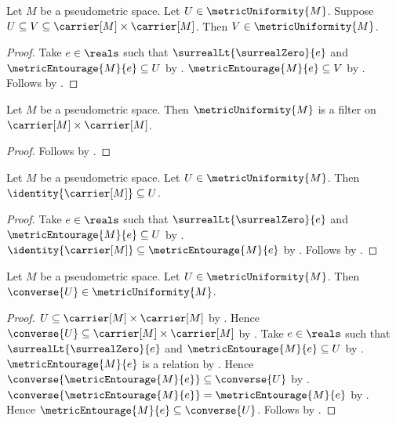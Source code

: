 \begin{proposition}\label{metric_uniformity_upward}
    Let $M$ be a pseudometric space.
    Let $U\in\metricUniformity{M}$.
    Suppose
        $U\subseteq V\subseteq\carrier[M]\times\carrier[M]$.
    Then $V\in\metricUniformity{M}$.
\end{proposition}
\begin{proof}
    Take $e\in\reals$ such that
        $\surrealLt{\surrealZero}{e}$ and
        $\metricEntourage{M}{e}\subseteq U$
        by .
    $\metricEntourage{M}{e}\subseteq V$
        by .
    Follows by .
\end{proof}

\begin{theorem}\label{metric_uniformity_is_filter}
    Let $M$ be a pseudometric space.
    Then $\metricUniformity{M}$ is a filter on
        $\carrier[M]\times\carrier[M]$.
\end{theorem}
\begin{proof}
    Follows by
        .
\end{proof}

\begin{proposition}\label{metric_uniformity_diagonal}
    Let $M$ be a pseudometric space.
    Let $U\in\metricUniformity{M}$.
    Then $\identity{\carrier[M]}\subseteq U$.
\end{proposition}
\begin{proof}
    Take $e\in\reals$ such that
        $\surrealLt{\surrealZero}{e}$ and
        $\metricEntourage{M}{e}\subseteq U$
        by .
    $\identity{\carrier[M]}\subseteq\metricEntourage{M}{e}$
        by .
    Follows by .
\end{proof}

\begin{proposition}\label{metric_uniformity_converse}
    Let $M$ be a pseudometric space.
    Let $U\in\metricUniformity{M}$.
    Then $\converse{U}\in\metricUniformity{M}$.
\end{proposition}
\begin{proof}
    $U\subseteq\carrier[M]\times\carrier[M]$
        by .
    Hence $\converse{U}\subseteq\carrier[M]\times\carrier[M]$
        by .
    Take $e\in\reals$ such that
        $\surrealLt{\surrealZero}{e}$ and
        $\metricEntourage{M}{e}\subseteq U$
        by .
    $\metricEntourage{M}{e}$ is a relation
        by
        .
    Hence
        $\converse{\metricEntourage{M}{e}}\subseteq\converse{U}$
        by .
    $\converse{\metricEntourage{M}{e}}
        =\metricEntourage{M}{e}$
        by .
    Hence $\metricEntourage{M}{e}\subseteq\converse{U}$.
    Follows by .
\end{proof}

